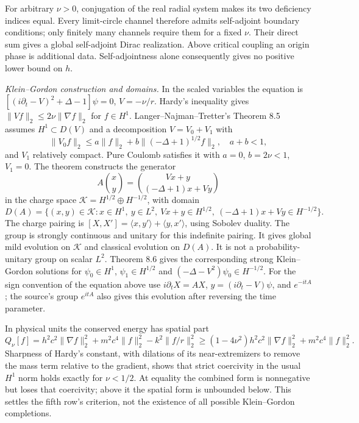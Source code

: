 \documentclass[11pt,a4paper]{article}
\begin{document}
For arbitrary \(\nu>0\), conjugation of the real radial system makes its
two deficiency indices equal. Every limit-circle channel therefore
admits self-adjoint boundary conditions; only finitely many channels
require them for a fixed \(\nu\). Their direct sum gives a global
self-adjoint Dirac realization. Above critical coupling an origin phase
is additional data. Self-adjointness alone consequently gives no
positive lower bound on \(h\).

\emph{Klein--Gordon construction and domains.} In the scaled variables
the equation is \([(i\partial_t-V)^2+\Delta-1]\psi=0\), \(V=-\nu/r\).
Hardy's inequality gives \(\|Vf\|_2\le2\nu\|\nabla f\|_2\) for
\(f\in H^1\). Langer--Najman--Tretter's Theorem 8.5 assumes
\(H^1\subset D(V)\) and a decomposition \(V=V_0+V_1\) with
\[\|V_0f\|_2\le a\|f\|_2+b\|(-\Delta+1)^{1/2}f\|_2,
\quad a+b<1,\] and \(V_1\) relatively compact. Pure Coulomb satisfies it
with \(a=0\), \(b=2\nu<1\), \(V_1=0\). The theorem constructs the
generator \[A\binom{x}{y}=\binom{Vx+y}{(-\Delta+1)x+Vy}\] in the charge
space \(\mathcal K=H^{1/2}\oplus H^{-1/2}\), with domain
\[D(A)=\{(x,y)\in\mathcal K:x\in H^1,\ y\in L^2,
\ Vx+y\in H^{1/2},\ (-\Delta+1)x+Vy\in H^{-1/2}\}.\] The charge pairing
is \([X,X']=\langle x,y'\rangle+\langle y,x'\rangle\), using Sobolev
duality. The group is strongly continuous and unitary for this
indefinite pairing. It gives global mild evolution on \(\mathcal K\) and
classical evolution on \(D(A)\). It is not a probability-unitary group
on scalar \(L^2\). Theorem 8.6 gives the corresponding strong
Klein--Gordon solutions for \(\psi_0\in H^1\), \(\psi_1\in H^{1/2}\) and
\((-\Delta-V^2)\psi_0\in H^{-1/2}\). For the sign convention of the
equation above use \(i\partial_tX=AX\), \(y=(i\partial_t-V)\psi\), and
\(e^{-itA}\); the source's group \(e^{itA}\) also gives this evolution
after reversing the time parameter.

In physical units the conserved energy has spatial part
\[Q_\nu[f]=h^2c^2\|\nabla f\|_2^2+m^2c^4\|f\|_2^2
-k^2\|f/r\|_2^2
\ge(1-4\nu^2)h^2c^2\|\nabla f\|_2^2+m^2c^4\|f\|_2^2.\] Sharpness of
Hardy's constant, with dilations of its near-extremizers to remove the
mass term relative to the gradient, shows that strict coercivity in the
usual \(H^1\) norm holds exactly for \(\nu<1/2\). At equality the
combined form is nonnegative but loses that coercivity; above it the
spatial form is unbounded below. This settles the fifth row's criterion,
not the existence of all possible Klein--Gordon completions.
\end{document}
